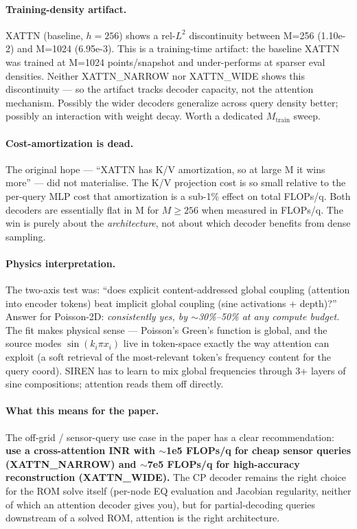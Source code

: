 \documentclass[11pt]{article}
\begin{document}
\paragraph{Training-density artifact.}
XATTN (baseline, $h{=}256$) shows a rel-$L^2$ discontinuity between
M=256 (1.10e-2) and M=1024 (6.95e-3). This is a training-time artifact:
the baseline XATTN was trained at M=1024 points/snapshot and
under-performs at sparser eval densities. Neither XATTN\_NARROW nor
XATTN\_WIDE shows this discontinuity --- so the artifact tracks decoder
capacity, not the attention mechanism. Possibly the wider decoders
generalize across query density better; possibly an interaction with
weight decay. Worth a dedicated $M_{\text{train}}$ sweep.

\paragraph{Cost-amortization is dead.}
The original hope --- ``XATTN has K/V amortization, so at large M it
wins more'' --- did not materialise. The K/V projection cost is so
small relative to the per-query MLP cost that amortization is a
sub-1\% effect on total FLOPs/q. Both decoders are essentially flat in
M for $M \geq 256$ when measured in FLOPs/q. The win is purely about
the \emph{architecture}, not about which decoder benefits from dense
sampling.

\paragraph{Physics interpretation.}
The two-axis test was: ``does explicit content-addressed global coupling
(attention into encoder tokens) beat implicit global coupling (sine
activations + depth)?'' Answer for Poisson-2D: \emph{consistently yes,
by $\sim$30\%--50\% at any compute budget.} The fit makes physical
sense --- Poisson's Green's function is global, and the source modes
$\sin(k_i \pi x_i)$ live in token-space exactly the way attention can
exploit (a soft retrieval of the most-relevant token's frequency
content for the query coord). SIREN has to learn to mix global
frequencies through 3+ layers of sine compositions; attention reads
them off directly.

\paragraph{What this means for the paper.}
The off-grid / sensor-query use case in the paper has a clear
recommendation: \textbf{use a cross-attention INR with $\sim$1e5 FLOPs/q
for cheap sensor queries (XATTN\_NARROW) and $\sim$7e5 FLOPs/q for
high-accuracy reconstruction (XATTN\_WIDE).} The CP decoder remains
the right choice for the ROM solve itself (per-node EQ evaluation and
Jacobian regularity, neither of which an attention decoder gives you),
but for partial-decoding queries downstream of a solved ROM, attention
is the right architecture.
\end{document}
